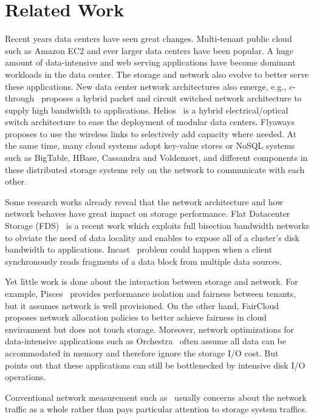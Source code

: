 \section{Related Work}
Recent years data centers have seen great changes. Multi-tenant public cloud such as Amazon EC2 and ever larger data centers have been popular. A huge amount of data-intensive and web serving applications have become dominant workloads in the data center. The storage and network also evolve to better serve these applications. New data center network architectures also emerge, e.g., c-through~\cite{c-through} proposes a hybrid packet and circuit switched network architecture to supply high bandwidth to applications. Helios~\cite{helios} is a hybrid electrical/optical switch architecture to ease the deployment of modular data centers. Flyaways~\cite{flyaways} proposes to use the wireless links to selectively add capacity where needed. At the same time, many cloud systems adopt key-value stores or NoSQL systems such as BigTable, HBase, Cassandra and Voldemort, and different components in these distributed storage systems rely on the network to communicate with each other.

Some research works already reveal that the network architecture and how network behaves have great impact on storage performance. Flat Datacenter Storage (FDS)~\cite{flat-datacenter-storage} is a recent work which exploits full bisection bandwidth networks to obviate the need of data locality and enables to expose all of a cluster’s disk bandwidth to applications. Incast~\cite{incast} problem could happen when a client synchronously reads fragments of a data block from multiple data sources.

Yet little work is done about the interaction between storage and network. For example, Pisces~\cite{pisces} provides performance isolation and fairness between tenants, but it assumes network is well provisioned. On the other hand, FairCloud~\cite{faircloud} proposes network allocation policies to better achieve fairness in cloud environment but does not touch storage. Moreover, network optimizations for data-intensive applications such as Orchestra~\cite{orchestra} often assume all data can be accommodated in memory and therefore ignore the storage I/O cost. But ~\cite{c-through} points out that these applications can still be bottlenecked by intensive disk I/O operations.

Conventional network measurement such as~\cite{wild} usually concerns about the network traffic as a whole rather than pays particular attention to storage system traffics.
